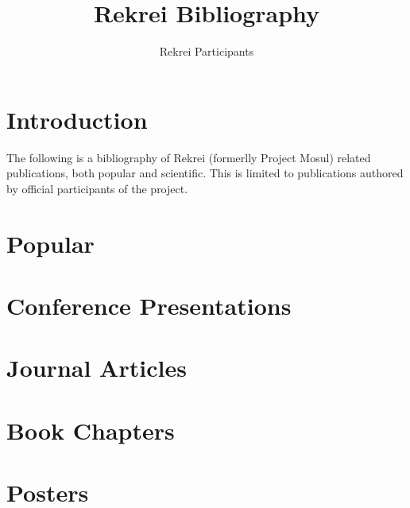 \documentclass[a4paper]{article}
\title{Rekrei Bibliography}
\author{Rekrei Participants}
\begin{document}
\maketitle

\clearpage
\tableofcontents

\clearpage
\section{Introduction}
The following is a bibliography of Rekrei (formerlly Project Mosul) related publications, both popular and scientific. This is limited to publications authored by official participants of the project.

\clearpage
\section{Popular}

\section{Conference Presentations}


\section{Journal Articles}

\section{Book Chapters}
\section{Posters}

\clearpage
{}

\nocite{*}

\printindex
\end{document}
